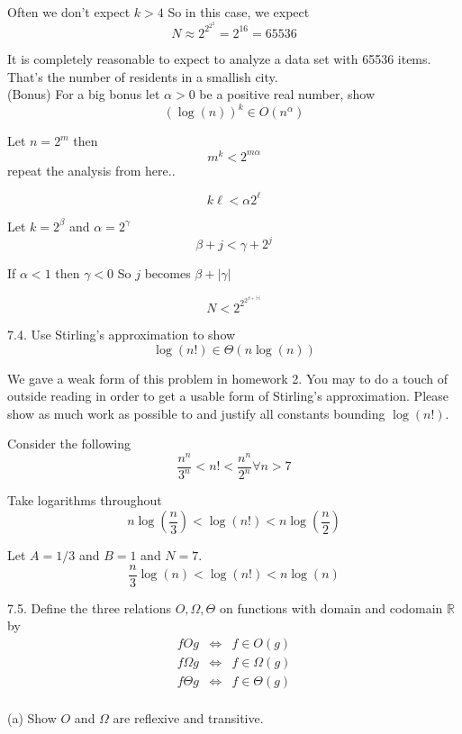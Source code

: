 \documentclass[16 pt]{amsart}
\theoremstyle{definition}
\theoremstyle{remark}
\numberwithin{equation}{subsection}
\newcommand{\R}{\mathbb{R}}
\begin{document}
Often we don't expect $k>4$  So in this case, we expect
\[
N \approx 2^{2^{2^2}} = 2^{16} = 65536
\]

It is completely reasonable to expect to analyze a data set with 65536 items.  That's the number of residents in a smallish city.\\







(Bonus) For a big bonus let $\alpha>0$ be a positive real number, show
\[
(\log(n))^k \in O(n^{\alpha})
\]

Let $n=2^m$ then
\[
m^k < 2^{m\alpha}
\]
repeat the analysis from here..

\[
k \ell < \alpha 2^{\ell} 
\]

Let $k=2^{\beta}$ and $\alpha = 2^{\gamma}$ 
\[
\beta + j < \gamma + 2^j
\]

If $\alpha<1$ then $\gamma<0$
So $j$ becomes $\beta+|\gamma|$

\[
N < 2^{2^{2^{\beta+|\gamma|}}}
\]



7.4. Use Stirling's approximation to show
\[
\log(n!) \in \Theta (n\log(n))
\]

We gave a weak form of this problem in homework 2.  You may to do a touch of outside reading in order to get a usable form of Stirling's approximation.  Please show as much work as possible to and justify all constants bounding $\log(n!)$.

Consider the following
\[
\frac{n^n}{3^n} < n! < \frac{n^n}{2^n} \forall n>7
\]

Take logarithms throughout
\[
n\log\left(\frac{n}{3}\right) < \log(n!) < n\log\left(\frac{n}{2}\right)
\]

Let $A=1/3$ and $B=1$ and $N=7$.\\

\[
\frac{n}{3} \log(n) < \log(n!) < n\log(n)
\]




7.5. Define the three relations $O,\Omega, \Theta$ on functions with domain and codomain $\R$ by
\[
\begin{array}{ccc}
f O g & \iff & f\in O(g)\\
f \Omega g & \iff & f\in \Omega (g)\\
f \Theta g & \iff & f\in \Theta(g)\\
\end{array}
\]

(a) Show $O$ and $\Omega$ are reflexive and transitive.\\
\end{document}

